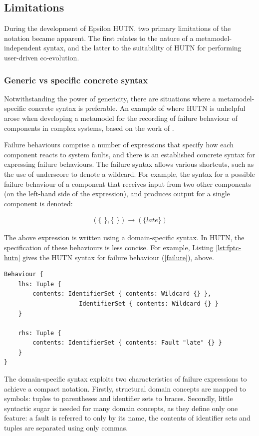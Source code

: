 \subsection{Limitations}
During the development of Epsilon HUTN, two primary limitations of the notation became apparent. The first relates to the nature of a metamodel-independent syntax, and the latter to the suitability of HUTN for performing user-driven co-evolution.

\subsubsection{Generic vs specific concrete syntax}
Notwithstanding the power of genericity, there are situations where a metamodel-specific concrete syntax is preferable. An example of where HUTN is unhelpful arose when developing a metamodel for the recording of failure behaviour of components in complex systems, based on the work of \cite{wallace05modular}.

Failure behaviours comprise a number of expressions that specify how each component reacts to system faults, and there is an established concrete syntax for expressing failure behaviours. The failure syntax allows various shortcuts, such as the use of underscore to denote a wildcard. For example, the syntax for a possible failure behaviour of a component that receives input from two other components (on the left-hand side of the expression), and produces output for a single component is denoted:

\begin{eqnarray}\label{failure}
(\{\_\}, \{\_\}) \rightarrow (\{late\})
\end{eqnarray}

The above expression is written using a domain-specific syntax. In HUTN, the specification of these behaviours is less concise. For example, Listing \ref{lst:fptc-hutn} gives the HUTN syntax for failure behaviour (\ref{failure}), above.

\begin{lstlisting}[caption=Failure behaviour specified in HUTN., label=lst:fptc-hutn, language=FPTC]
Behaviour {
    lhs: Tuple {
        contents: IdentifierSet { contents: Wildcard {} },
                     IdentifierSet { contents: Wildcard {} }
    }

    rhs: Tuple {
        contents: IdentifierSet { contents: Fault "late" {} }
    }
}
\end{lstlisting}

The domain-specific syntax exploits two characteristics of failure expressions to achieve a compact notation. Firstly, structural domain concepts are mapped to symbols: tuples to parentheses and identifier sets to braces. Secondly, little syntactic sugar is needed for many domain concepts, as they define only one feature: a fault is referred to only by its name, the contents of identifier sets and tuples are separated using only commas.

